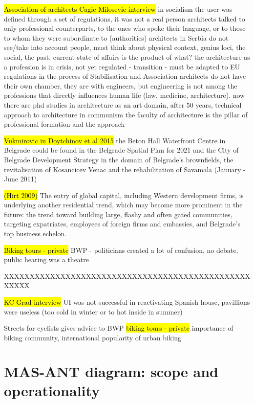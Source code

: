 \documentclass[11pt]{report}
\begin{document}
\hl{Association of architects Cagic Milosevic interview}
in socialism the user was defined through a set of regulations, it was not a real person
architects talked to only professional counterparts, to the ones who spoke their language, or to those to whom they were subordinate to (authorities)
architects in Serbia do not see/take into account people, must think about physical context, genius loci, the social, the past, current state of affairs is the product of what?
the architecture as a profession is in crisis, not yet regulated - transition - must be adapted to EU regulations in the process of Stabilisation and Association
architects do not have their own chamber, they are with engineers, but engineering is not among the professions that directly influences human life (law, medicine, architecture).
now there are phd studies in architecture as an art domain, after 50 years, technical approach to architecture in communism
the faculty of architecture is the pillar of professional formation and the approach

\hl{Vukmirovic in Doytchinov et al 2015}
the Beton Hall Waterfront Centre in Belgrade could be found in the Belgrade Spatial Plan for 2021 and the City of Belgrade Development Strategy in the domain of Belgrade’s brownfields, the revitalisation of Kosancicev Venac and the rehabilitation of Savamala  (January - June 2011)

\hl{(Hirt 2009)}
The entry of global capital, including Western development ﬁrms, is underlying another residential trend, which may become more prominent in the future: the trend toward building large, ﬂashy and often gated communities, targeting expatriates, employees of foreign firms and embassies, and Belgrade’s top business echelon.

\hl{Biking tours - private}
BWP - politicians created a lot of confusion, no debate, public hearing was a theatre

XXXXXXXXXXXXXXXXXXXXXXXXXXXXXXXXXXXXXXXXXXXXXXXXXXXXX

\hl{KC Grad interview}
UI was not successful in reactivating Spanish house, pavillions were useless (too cold in winter or to hot inside in summer)

Streets for cyclists gives advice to BWP \hl{biking tours - private}
importance of biking community, international popularity of urban biking

\section{MAS-ANT diagram: scope and operationality}
\end{document}

